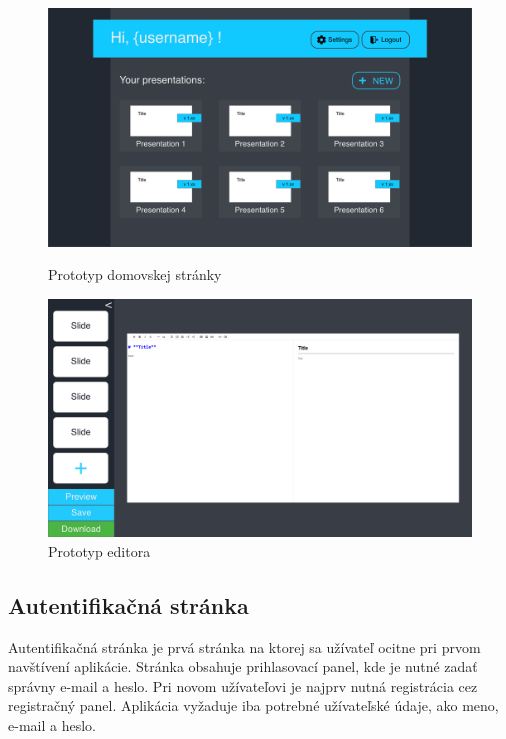 \begin{figure}[!hbt]
\centering
\begin{minipage}{.5\textwidth}
  \centering
  \includegraphics[scale=0.1]{obrazky/prototyp_domovska_stranka.png}
  \caption{Prototyp domovskej stránky}
  \label{pic:prototyp_domovska_stranka}
\end{minipage}%
\begin{minipage}{.5\textwidth}
  \centering
  \includegraphics[scale=0.1]{obrazky/prototyp_editor.png}
  \caption{Prototyp editora}
  \label{pic:prototyp_editor}
\end{minipage}
\end{figure}

\subsection*{Autentifikačná stránka}
Autentifikačná stránka je prvá stránka na ktorej sa užívateľ ocitne pri prvom navštívení aplikácie. Stránka obsahuje prihlasovací panel, kde je nutné zadať správny e-mail a heslo. Pri novom užívateľovi je najprv nutná registrácia cez registračný panel. Aplikácia vyžaduje iba potrebné užívateľské údaje, ako meno, e-mail a heslo.


